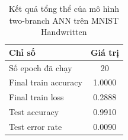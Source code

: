 \begin{table}[H]
\centering
\caption{Kết quả tổng thể của mô hình two-branch ANN trên MNIST Handwritten}
\label{tab:mnist-ann-overall-results}
\begin{tabular}{l c}
\toprule
Chỉ số & Giá trị \\
\midrule
Số epoch đã chạy & 20 \\
Final train accuracy & 1.0000 \\
Final train loss & 0.2888 \\
Test accuracy & 0.9910 \\
Test error rate & 0.0090 \\
\bottomrule
\end{tabular}
\end{table}
